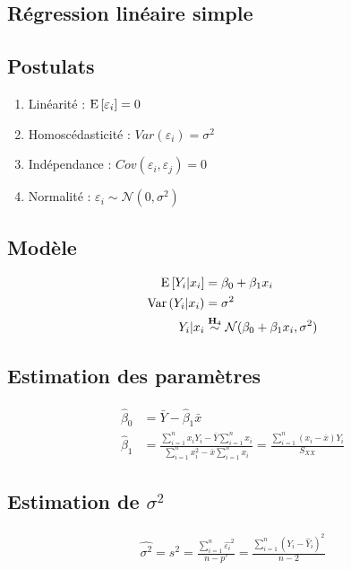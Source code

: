 \documentclass[10pt, french]{article}
\begin{document}
\begin{multicols*}{3} %
\section{Régression linéaire simple}
\subsection*{Postulats}
\begin{enumerate}[label=$\mathbf{H}_{\arabic*}$]
\item Linéarité : $\mathrm{E} \left[ \varepsilon_i \right] = 0$
\item Homoscédasticité : $Var(\varepsilon_i)= \sigma^2$
\item Indépendance : $Cov(\varepsilon_i, \varepsilon_j) = 0$
\item Normalité : $\varepsilon_i \sim \mathcal{N} (0, \sigma^2)$
\end{enumerate}
\subsection*{Modèle}
\begin{align*}
\mathrm{E} \left[ Y_i | x_i \right] 	& = \beta_0 + \beta_1 x_i \\
\mathrm{Var} \left( Y_i | x_i \right)	& = \sigma^2 \\
Y_i | x_i & \overset{\mathbf{H}_4}{\sim} \mathcal{N} (\beta_0 + \beta_1 x_i, \sigma^2) \\
\end{align*}

\subsection*{Estimation des paramètres}
\begin{align*}
\hat{\beta}_0 	& = \bar{Y} - \hat{\beta}_1 \bar{x} \\
\hat{\beta}_1	& = \frac{\sum_{i=1}^{n} x_i Y_i - \bar{Y} \sum_{i=1}^{n} x_i}{\sum_{i=1}^{n} x_i^2 - \bar{x} \sum_{i=1}^{n} x_i} = \frac{\sum_{i=1}^{n}(x_i - \bar{x})Y_i}{S_{XX}}
\end{align*}

\subsection*{Estimation de $\sigma^2$}
\begin{align*}
\hat{\sigma^2} = s^2 = \frac{\sum_{i=1}^{n} \hat{\varepsilon_i}^2}{n-p'} = \frac{\sum_{i=1}^{n} (Y_i - \hat{Y}_i)^2}{n-2}
\end{align*}


\end{multicols*}
\end{document}
